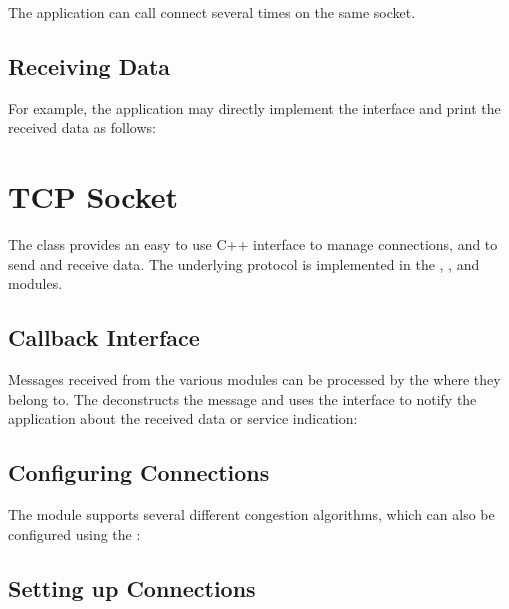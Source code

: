 
The application can call connect several times on the same socket.

\subsection*{Receiving Data}

For example, the application may directly implement the
 interface and print the received data as
follows:


\section{TCP Socket}
\label{sec:sockets:tcp-socket}

The  class provides an easy to use C++ interface to manage
 connections, and to send and receive data. The underlying
 protocol is implemented in the , ,
and  modules.

\subsection*{Callback Interface}

Messages received from the various  modules can be processed by the
 where they belong to. The  deconstructs
the message and uses the  interface to notify the
application about the received data or service indication:


\subsection*{Configuring Connections}

The  module supports several  different congestion
algorithms, which can also be configured using the :


\subsection*{Setting up Connections}

